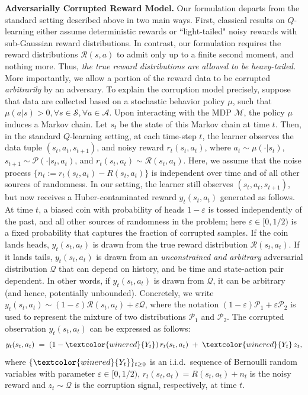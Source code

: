 \documentclass{article}
\newcommand{\mc}{\mathcal}
\begin{document}
\textbf{Adversarially Corrupted Reward Model.} Our formulation departs from the standard setting described above in two main ways. First, classical results on \(Q\)-learning either assume deterministic rewards or ``light-tailed" noisy rewards with sub-Gaussian reward distributions. In contrast, our formulation requires the reward distributions $\mc{R}(s,a)$ to admit only up to a finite second moment, and nothing more. Thus, \emph{the true reward distributions are allowed to be heavy-tailed.} More importantly, we allow a portion of the reward data to be corrupted \emph{arbitrarily} by an adversary. To explain the corruption model precisely, suppose that data are collected based on a stochastic behavior policy $\mu$, such that $\mu(a|s) >0, \forall s \in \mc{S}, \forall a \in \mc{A}.$ Upon interacting with the MDP $\mc{M}$, the policy $\mu$ induces a Markov chain. Let $s_t$ be the state of this Markov chain at time $t$. Then, in the standard \(Q\)-learning setting, at each time-step $t$, the learner observes the data tuple $(s_t, a_t, s_{t+1})$, and noisy reward $r_t(s_t, a_t)$, where $a_t \sim \mu(\cdot|s_t)$, $s_{t+1} \sim \mc{P}(\cdot| s_t, a_t)$, and $r_t(s_t, a_t) \sim \mc{R}(s_t, a_t)$. Here, we assume that the noise process $\{n_t:= r_t(s_t,a_t) - R(s_t, a_t)\}$ is independent over time and of all other sources of randomness. In our setting, the learner still observes $(s_t, a_t, s_{t+1})$, but now receives a Huber-contaminated reward $y_t(s_t, a_t)$ generated as follows. At time $t$, a biased coin with probability of heads $1-\varepsilon$ is tossed independently of the past, and all other sources of randomness in the problem; here $\varepsilon \in [0, 1/2)$ is a fixed probability that captures the fraction of corrupted samples. If the coin lands heads, $y_t(s_t, a_t)$ is drawn from the true reward distribution $\mc{R}(s_t, a_t)$. If it lands tails, $y_t(s_t, a_t)$ is drawn from an \emph{unconstrained and arbitrary} adversarial distribution $\mc{Q}$ that can depend on history, and be time and state-action pair dependent. In other words, if $y_t(s_t, a_t)$ is drawn from $\mc{Q}$, it can be arbitrary (and hence, potentially unbounded). Concretely, we write $y_t(s_t, a_t) \sim (1-\varepsilon) \mc{R}(s_t, a_t) + \varepsilon \mc{Q}$, where the notation $(1-\varepsilon) \mc{P}_1+\varepsilon \mc{P}_2$ is used to represent the mixture of two distributions $\mc{P}_1$ and $\mc{P}_2.$ The corrupted observation $y_t(s_t,a_t)$ can be expressed as follows:
\begin{equation}\label{eqn:formal_huber_corruption}
y_t(s_t,a_t) \;=\; (1-\textcolor{winered}{Y_t})\, r_t(s_t,a_t) \;+\; \textcolor{winered}{Y_t}\, z_t, 
\end{equation}
where $\{\textcolor{winered}{Y_t}\}_{t\geq 0}$ 
is an i.i.d.\ sequence of Bernoulli random variables with parameter $\varepsilon \in [0,1/2)$, $r_t(s_t,a_t) = R(s_t,a_t) + n_t$ is the noisy reward and $z_t \sim \mathcal{Q}$ is the corruption signal, respectively, at time $t$.  
\end{document}
